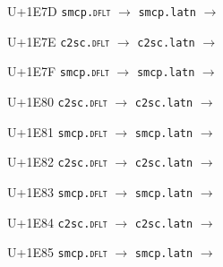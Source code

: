 \documentclass{article}
\begin{document}
\begin{substitutions}
\goodbreak

U+1E7D  \linebreak
    \texttt{smcp.\textsc{dflt}} $\to$  \linebreak
    \texttt{smcp.latn} $\to$  

\goodbreak

U+1E7E  \linebreak
    \texttt{c2sc.\textsc{dflt}} $\to$  \linebreak
    \texttt{c2sc.latn} $\to$  

\goodbreak

U+1E7F  \linebreak
    \texttt{smcp.\textsc{dflt}} $\to$  \linebreak
    \texttt{smcp.latn} $\to$  

\goodbreak

U+1E80  \linebreak
    \texttt{c2sc.\textsc{dflt}} $\to$  \linebreak
    \texttt{c2sc.latn} $\to$  

\goodbreak

U+1E81  \linebreak
    \texttt{smcp.\textsc{dflt}} $\to$  \linebreak
    \texttt{smcp.latn} $\to$  

\goodbreak

U+1E82  \linebreak
    \texttt{c2sc.\textsc{dflt}} $\to$  \linebreak
    \texttt{c2sc.latn} $\to$  

\goodbreak

U+1E83  \linebreak
    \texttt{smcp.\textsc{dflt}} $\to$  \linebreak
    \texttt{smcp.latn} $\to$  

\goodbreak

U+1E84  \linebreak
    \texttt{c2sc.\textsc{dflt}} $\to$  \linebreak
    \texttt{c2sc.latn} $\to$  

\goodbreak

U+1E85  \linebreak
    \texttt{smcp.\textsc{dflt}} $\to$  \linebreak
    \texttt{smcp.latn} $\to$  


\end{substitutions}
\end{document}
